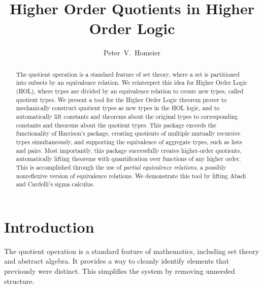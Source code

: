 \documentclass[envcountsame,runningheads]{llncs}
\newcommand{\quotient}{partial equivalence}
\begin{document}
\title{Higher Order Quotients in Higher Order Logic}


\author{Peter~V.~Homeier}



\maketitle

\begin{abstract}
The quotient operation is a standard feature of set theory, where
a set is partitioned into subsets by an equivalence relation.
We reinterpret this idea for Higher Order Logic (HOL), where types are
divided by an equivalence relation to create new types, called
quotient types.
We present a tool for the Higher Order Logic theorem prover
to mechanically construct quotient types as
new types in the HOL logic,
and to automatically lift constants and 
theorems about the original types
to corresponding constants and theorems about the quotient types.
This package exceeds the functionality of Harrison's package,
creating quotients of multiple mutually recursive types simultaneously,
and supporting the equivalence of aggregate types, such as lists and pairs.
Most importantly,
this package successfully
creates higher-order quotients, automatically lifting
theorems with quantification over functions
of any higher order.
This is accomplished through the
use
of {\it \quotient{} relations},
a possibly nonreflexive version of equivalence relations.
We demonstrate this tool by lifting Abadi and Cardelli's sigma calculus.
\end{abstract}


%
\section{Introduction}
%

The quotient operation is a standard feature of mathematics,
including set theory and abstract algebra.  It provides a way to
cleanly identify elements that previously were distinct.
This simplifies the system by removing unneeded structure.
\end{document}
